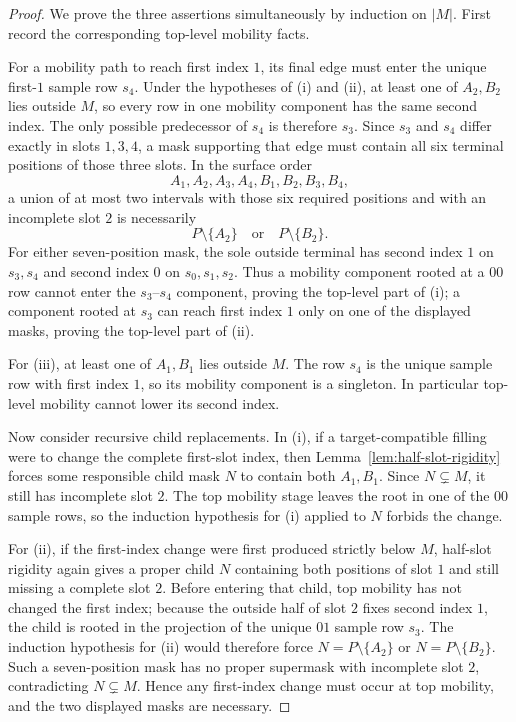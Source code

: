 \documentclass[11pt]{article}
\begin{document}
\begin{proof}
We prove the three assertions simultaneously by induction on $|M|$.  First
record the corresponding top-level mobility facts.

For a mobility path to reach first index $1$, its final edge must enter the
unique first-$1$ sample row $s_4$.  Under the hypotheses of \textup{(i)} and
\textup{(ii)}, at least one of $A_2,B_2$ lies outside $M$, so every row in one
mobility component has the same second index.  The only possible predecessor
of $s_4$ is therefore $s_3$.  Since $s_3$ and $s_4$ differ exactly in slots
$1,3,4$, a mask supporting that edge must contain all six terminal positions
of those three slots.  In the surface order
\[
 A_1,A_2,A_3,A_4,B_1,B_2,B_3,B_4,
\]
a union of at most two intervals with those six required positions and with an
incomplete slot $2$ is necessarily
\[
 P\setminus\{A_2\}\quad\text{or}\quad P\setminus\{B_2\}.
\]
For either seven-position mask, the sole outside terminal has second index
$1$ on $s_3,s_4$ and second index $0$ on $s_0,s_1,s_2$.  Thus a mobility
component rooted at a $00$ row cannot enter the $s_3$--$s_4$ component, proving
the top-level part of \textup{(i)}; a component rooted at $s_3$ can reach first
index $1$ only on one of the displayed masks, proving the top-level part of
\textup{(ii)}.

For \textup{(iii)}, at least one of $A_1,B_1$ lies outside $M$.  The row $s_4$
is the unique sample row with first index $1$, so its mobility component is a
singleton.  In particular top-level mobility cannot lower its second index.

Now consider recursive child replacements.  In \textup{(i)}, if a
 target-compatible filling were to change the complete first-slot index, then
Lemma~\ref{lem:half-slot-rigidity} forces some responsible child mask $N$ to
contain both $A_1,B_1$.  Since $N\subsetneq M$, it still has incomplete slot
$2$.  The top mobility stage leaves the root in one of the $00$ sample rows,
so the induction hypothesis for \textup{(i)} applied to $N$ forbids the
change.

For \textup{(ii)}, if the first-index change were first produced strictly
below $M$, half-slot rigidity again gives a proper child $N$ containing both
positions of slot $1$ and still missing a complete slot $2$.  Before entering
that child, top mobility has not changed the first index; because the outside
half of slot $2$ fixes second index $1$, the child is rooted in the projection
of the unique $01$ sample row $s_3$.  The induction hypothesis for
\textup{(ii)} would therefore force
\(N=P\setminus\{A_2\}\) or \(N=P\setminus\{B_2\}\).  Such a seven-position
mask has no proper supermask with incomplete slot $2$, contradicting
$N\subsetneq M$.  Hence any first-index change must occur at top mobility, and
the two displayed masks are necessary.


\end{proof}
\end{document}
